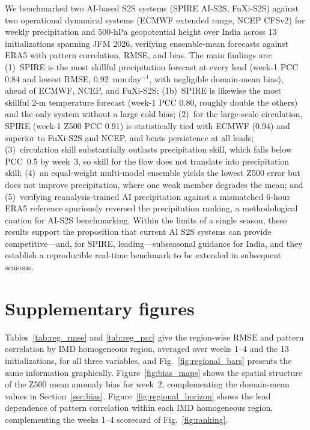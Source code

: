 \documentclass[11pt]{article}
\begin{document}
We benchmarked two AI-based S2S systems (SPIRE AI-S2S, FuXi-S2S)
against two operational dynamical systems (ECMWF extended range, NCEP
CFSv2) for weekly precipitation and 500-hPa geopotential height over
India across 13 initializations spanning JFM 2026, verifying
ensemble-mean forecasts against ERA5 with pattern correlation, RMSE, and
bias. The main findings are: (1)~SPIRE is the most skillful
precipitation forecast at every lead (week-1 PCC 0.84 and lowest RMSE,
0.92~mm\,day$^{-1}$, with negligible domain-mean bias), ahead of ECMWF,
NCEP, and FuXi-S2S; (1b)~SPIRE is likewise the most skillful 2-m
temperature forecast (week-1 PCC 0.80, roughly double the others) and the
only system without a large cold bias; (2)~for the large-scale
circulation, SPIRE (week-1 Z500 PCC 0.91) is statistically tied with
ECMWF (0.94) and superior to FuXi-S2S and NCEP, and beats persistence at
all leads; (3)~circulation
skill substantially outlasts precipitation skill, which falls below
PCC~0.5 by week~3, so skill for the flow does not translate into
precipitation skill; (4)~an equal-weight multi-model ensemble yields the
lowest Z500 error but does not improve precipitation, where one weak
member degrades the mean; and (5)~verifying reanalysis-trained AI
precipitation against a mismatched 6-hour ERA5 reference spuriously
reversed the precipitation ranking, a methodological caution for AI-S2S
benchmarking. Within the limits of a single season, these results
support the proposition that current AI S2S systems can provide
competitive---and, for SPIRE, leading---subseasonal guidance for India,
and they establish a reproducible real-time benchmark to be extended in
subsequent seasons.

\appendix
\section{Supplementary figures}\label{app:supp}

Tables~\ref{tab:reg_rmse} and \ref{tab:reg_pcc} give the region-wise
RMSE and pattern correlation by IMD homogeneous region, averaged over
weeks 1--4 and the 13 initializations, for all three variables, and
Fig.~\ref{fig:regional_bars} presents the same information graphically.
Figure~\ref{fig:bias_maps} shows the spatial structure of the Z500 mean
anomaly bias for week~2, complementing the domain-mean values in
Section~\ref{sec:bias}. Figure~\ref{fig:regional_horizon} shows the
lead dependence of pattern correlation within each IMD homogeneous
region, complementing the weeks 1--4 scorecard of
Fig.~\ref{fig:ranking}.
\end{document}

